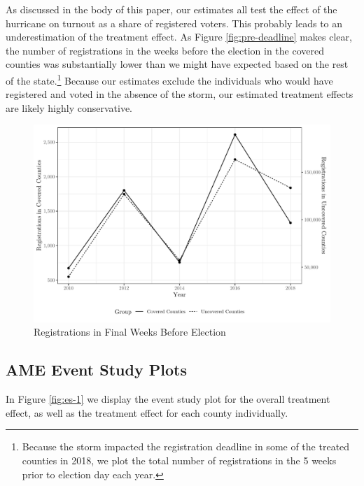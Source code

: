 \documentclass[
  12pt,
]{article}
\begin{document}
As discussed in the body of this paper, our estimates all test the effect of the hurricane on turnout as a share of registered voters. This probably leads to an underestimation of the treatment effect. As Figure \ref{fig:pre-deadline} makes clear, the number of registrations in the weeks before the election in the covered counties was substantially lower than we might have expected based on the rest of the state.\footnote{Because the storm impacted the registration deadline in some of the treated counties in 2018, we plot the total number of registrations in the 5 weeks prior to election day each year.} Because our estimates exclude the individuals who would have registered and voted in the absence of the storm, our estimated treatment effects are likely highly conservative.

\begin{figure}[H]

{\centering \includegraphics{si_files/figure-latex/regs-chunk-1} 

}

\caption{\label{fig:pre-deadline}Registrations in Final Weeks Before Election}\label{fig:regs-chunk}
\end{figure}

\hypertarget{ame-event-study-plots}{%
\subsection*{AME Event Study Plots}\label{ame-event-study-plots}}

In Figure \ref{fig:es-1} we display the event study plot for the overall treatment effect, as well as the treatment effect for each county individually.
\end{document}
